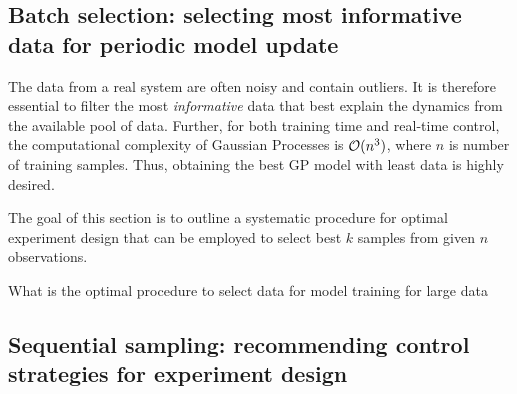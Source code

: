 \subsection{Batch selection: selecting most informative data for periodic model update}

The data from a real system are often noisy and contain outliers. 
It is therefore essential to filter the most \textit{informative} data that best explain the dynamics from the available pool of data.
Further, for both training time and real-time control, the computational complexity of Gaussian Processes is $\mathcal{O}(n^3)$, where $n$ is number of training samples. Thus, obtaining the best GP model with least data is highly desired.

The goal of this section is to outline a systematic procedure for optimal experiment design that can be employed to select best $k$ samples from given $n$ observations.

What is the optimal procedure to select data for model training for large data

\begin{figure}[!tb]
	\centering
	\caption{}
	\captionsetup{justification=centering}
	\label{F:OED}
\end{figure}

\subsection{Sequential sampling: recommending control strategies for experiment design }


\begin{figure}[!tb]
	\centering
	\caption{}
	\captionsetup{justification=centering}
	\label{F:OED-acc}
\end{figure}
